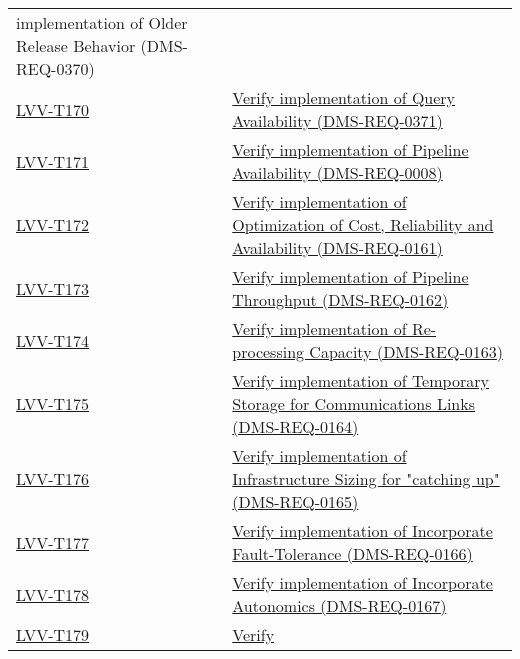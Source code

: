 \begin{longtable}[]{p{3cm}p{13cm}}
{implementation of Older Release Behavior (DMS-REQ-0370)}\tabularnewline
\protect\hyperlink{lvv-t170---verify-implementation-of-query-availability-dms-req-0371}{LVV-T170}
&
\href{https://jira.lsstcorp.org/secure/Tests.jspa\#/testCase/LVV-T170}{Verify
implementation of Query Availability (DMS-REQ-0371)}\tabularnewline
\protect\hyperlink{lvv-t171---verify-implementation-of-pipeline-availability-dms-req-0008}{LVV-T171}
&
\href{https://jira.lsstcorp.org/secure/Tests.jspa\#/testCase/LVV-T171}{Verify
implementation of Pipeline Availability (DMS-REQ-0008)}\tabularnewline
\protect\hyperlink{lvv-t172---verify-implementation-of-optimization-of-cost-reliability-and-availability-dms-req-0161}{LVV-T172}
&
\href{https://jira.lsstcorp.org/secure/Tests.jspa\#/testCase/LVV-T172}{Verify
implementation of Optimization of Cost, Reliability and Availability
(DMS-REQ-0161)}\tabularnewline
\protect\hyperlink{lvv-t173---verify-implementation-of-pipeline-throughput-dms-req-0162}{LVV-T173}
&
\href{https://jira.lsstcorp.org/secure/Tests.jspa\#/testCase/LVV-T173}{Verify
implementation of Pipeline Throughput (DMS-REQ-0162)}\tabularnewline
\protect\hyperlink{lvv-t174---verify-implementation-of-re-processing-capacity-dms-req-0163}{LVV-T174}
&
\href{https://jira.lsstcorp.org/secure/Tests.jspa\#/testCase/LVV-T174}{Verify
implementation of Re-processing Capacity (DMS-REQ-0163)}\tabularnewline
\protect\hyperlink{lvv-t175---verify-implementation-of-temporary-storage-for-communications-links-dms-req-0164}{LVV-T175}
&
\href{https://jira.lsstcorp.org/secure/Tests.jspa\#/testCase/LVV-T175}{Verify
implementation of Temporary Storage for Communications Links
(DMS-REQ-0164)}\tabularnewline
\protect\hyperlink{lvv-t176---verify-implementation-of-infrastructure-sizing-for-catching-up-dms-req-0165}{LVV-T176}
&
\href{https://jira.lsstcorp.org/secure/Tests.jspa\#/testCase/LVV-T176}{Verify
implementation of Infrastructure Sizing for "catching up"
(DMS-REQ-0165)}\tabularnewline
\protect\hyperlink{lvv-t177---verify-implementation-of-incorporate-fault-tolerance-dms-req-0166}{LVV-T177}
&
\href{https://jira.lsstcorp.org/secure/Tests.jspa\#/testCase/LVV-T177}{Verify
implementation of Incorporate Fault-Tolerance
(DMS-REQ-0166)}\tabularnewline
\protect\hyperlink{lvv-t178---verify-implementation-of-incorporate-autonomics-dms-req-0167}{LVV-T178}
&
\href{https://jira.lsstcorp.org/secure/Tests.jspa\#/testCase/LVV-T178}{Verify
implementation of Incorporate Autonomics (DMS-REQ-0167)}\tabularnewline
\protect\hyperlink{lvv-t179---verify-implementation-of-compute-platform-heterogeneity-dms-req-0314}{LVV-T179}
&
\href{https://jira.lsstcorp.org/secure/Tests.jspa\#/testCase/LVV-T179}{Verify
}
\end{longtable}

